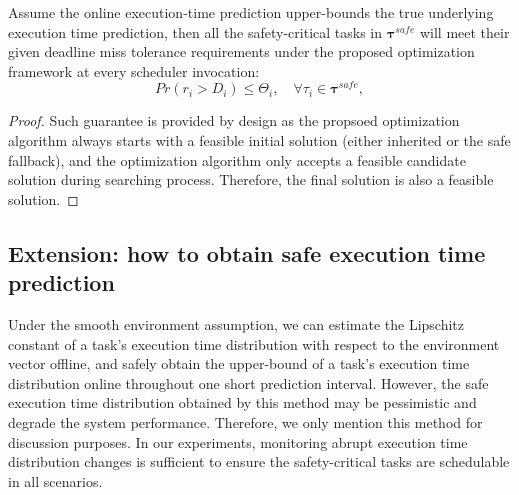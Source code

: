     \begin{theorem}
    \label{obs:safety_fallback}

    Assume the online execution-time prediction upper-bounds the true underlying execution time prediction, 
    then all the safety-critical tasks in $\boldsymbol{\tau}^{safe}$ will meet their given deadline miss tolerance requirements
    under the proposed optimization framework at every scheduler invocation:
    \[
        Pr(r_i > D_i) \leq \Theta_i, \quad \forall \tau_i \in \boldsymbol{\tau}^{safe},
    \]
    \end{theorem}
    \begin{proof}
    Such guarantee is provided by design as the propsoed optimization algorithm always starts with a feasible initial solution (either inherited or the safe fallback),
    and the optimization algorithm only accepts a feasible candidate solution during searching process. Therefore, the final solution is also a feasible solution.
    \end{proof}

    
    \subsection{Extension: how to obtain safe execution time prediction}
    Under the smooth environment assumption, we can estimate the Lipschitz constant of a task's execution time distribution with respect to the environment vector offline, and safely obtain the upper-bound of a task's execution time distribution online throughout one short prediction interval.
    However, the safe execution time distribution obtained by this method may be pessimistic and degrade the system performance. 
    Therefore, we only mention this method for discussion purposes. In our experiments, monitoring abrupt execution time distribution changes is sufficient to ensure the safety-critical tasks are schedulable in all scenarios.